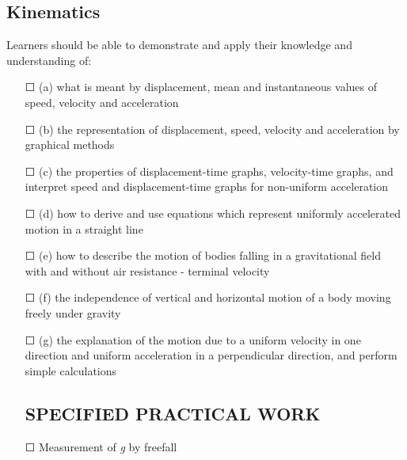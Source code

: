 \subsection{Kinematics}
Learners should be able to demonstrate and apply their knowledge and
understanding of:
\begin{itemize}
	\item[\Large{$\Square$}](a) what is meant by \sq displacement, mean and instantaneous values of \sq speed, \sq velocity and \sq acceleration
	\item[\Large{$\Square$}](b) the representation of \sq displacement, \sq speed, \sq velocity and \sq acceleration by graphical methods
	\item[\Large{$\Square$}](c) the properties of \sq displacement-time graphs, \sq velocity-time graphs, and \sq interpret speed and displacement-time graphs for non-uniform acceleration
	\item[\Large{$\Square$}](d) how to derive and use equations which represent uniformly accelerated
	motion in a straight line
	\item[\Large{$\Square$}](e) how to describe the motion of bodies falling in a gravitational field \sq with and \sq without air resistance - terminal velocity
	\item[\Large{$\Square$}](f) the independence of vertical and horizontal motion of a body moving freely under gravity
	\item[\Large{$\Square$}](g) the explanation of the motion due to a uniform velocity in one direction and uniform acceleration in a perpendicular direction, and \sq perform simple
	calculations
	\subsection*{SPECIFIED PRACTICAL WORK}
	\item[\Large{$\Square$}] Measurement of \textit{g} by freefall
\end{itemize}
